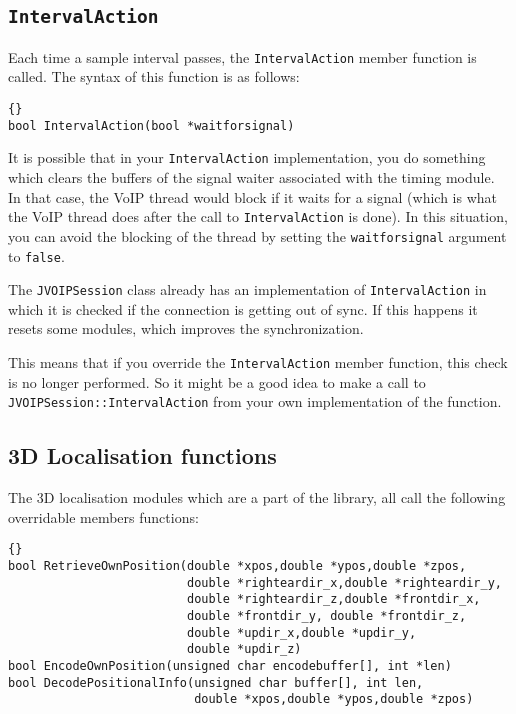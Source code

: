 		\subsection{\tt IntervalAction}
		
		Each time a sample interval passes, the {\tt IntervalAction} member function
		is called. The syntax of this function is as follows:
		\begin{lstlisting}[frame=tb]{}
bool IntervalAction(bool *waitforsignal)
		\end{lstlisting}
		
		It is possible that in your {\tt IntervalAction} implementation, you do
		something which clears the buffers of the signal waiter associated with
		the timing module. In that case, the VoIP thread would block if it waits
		for a signal (which is what the VoIP thread does after the call to
		{\tt Interval\-Action} is done). In this situation, you can avoid the 
		blocking of the thread by setting the {\tt wait\-for\-signal} argument 
		to {\tt false}.
		
		The {\tt JVOIPSession} class already has an implementation of {\tt Interval\-Action}
		in which it is checked if the connection is getting out of sync. If this
		happens it resets some modules, which improves the synchronization.
		
		This means that if you override the {\tt Interval\-Action} member function,
		this check is no longer performed. So it might be a good idea to make a call
		to {\tt JVOIP\-Session::\-Interval\-Action} from your own implementation of
		the function.
		
		\subsection{3D Localisation functions}
		
		The 3D localisation modules which are a part of the library, all call the
		following overridable members functions:
		\begin{lstlisting}[frame=tb]{}
bool RetrieveOwnPosition(double *xpos,double *ypos,double *zpos,
                         double *righteardir_x,double *righteardir_y,
                         double *righteardir_z,double *frontdir_x,
						 double *frontdir_y, double *frontdir_z,
						 double *updir_x,double *updir_y,
						 double *updir_z)
bool EncodeOwnPosition(unsigned char encodebuffer[], int *len)
bool DecodePositionalInfo(unsigned char buffer[], int len, 
                          double *xpos,double *ypos,double *zpos)
		\end{lstlisting}
		
